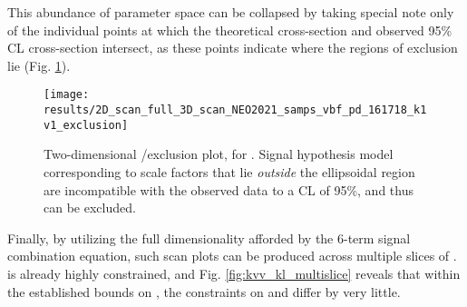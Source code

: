     \FloatBarrier
    This abundance of parameter space can be collapsed by taking special note only of
        the individual points at which the theoretical cross-section and observed 95\% CL cross-section intersect,
        as these points indicate where the regions of exclusion lie (Fig. \ref{fig:kvv_kl_2Dscan}).

    \begin{figure}
        \texttt{[image: results/2D\_scan\_full\_3D\_scan\_NEO2021\_samps\_vbf\_pd\_161718\_k1v1\_exclusion]}
        \caption{Two-dimensional \kvv/\kl exclusion plot, for .
            Signal hypothesis model corresponding to scale factors that lie
                \textit{outside} the ellipsoidal region are incompatible with the observed data to a CL of 95\%,
                and thus can be excluded.
            }
        \label{fig:kvv_kl_2Dscan}
    \end{figure}

    Finally, by utilizing the full dimensionality afforded by the 6-term signal combination equation,
        such scan plots can be produced across multiple slices of \kv.
    \kv is already highly constrained, and Fig. \ref{fig:kvv_kl_multislice}
        reveals that within the established bounds on \kv,
        the constraints on \kl and \kvv differ by very little.

